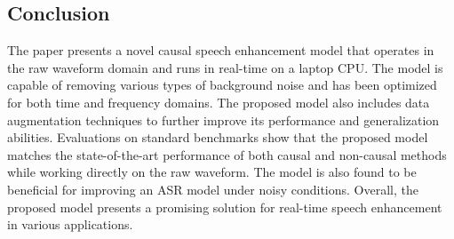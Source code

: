 \subsection{Conclusion}
The paper presents a novel causal speech enhancement model that operates in the raw waveform domain and runs in real-time on a laptop CPU. The model is capable of removing various types of background noise and has been optimized for both time and frequency domains. The proposed model also includes data augmentation techniques to further improve its performance and generalization abilities. Evaluations on standard benchmarks show that the proposed model matches the state-of-the-art performance of both causal and non-causal methods while working directly on the raw waveform. The model is also found to be beneficial for improving an ASR model under noisy conditions. Overall, the proposed model presents a promising solution for real-time speech enhancement in various applications.